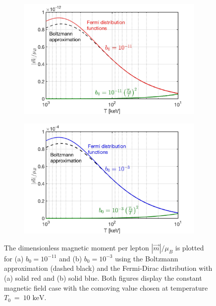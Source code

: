 \documentclass[a4paper]{article}
\newcommand*{\keV}{\text{ keV}}
\begin{document}
\begin{figure}[ht]
    \centering
    \begin{subfigure}[b]{0.49\textwidth}
        \includegraphics[width=\textwidth]{NewMagnetizationDensity001.jpg}
        \caption{}
        \label{fig:one}
    \end{subfigure}
    \hfill
    \begin{subfigure}[b]{0.49\textwidth}
        \includegraphics[width=\textwidth]{NewMagnetizationDensity002.jpg}
        \caption{}
        \label{fig:two}
    \end{subfigure}
    \caption{The dimensionless magnetic moment per lepton $|\vec{m}|/\mu_{B}$ is plotted for (a) $b_{0}=10^{-11}$ and (b) $b_{0}=10^{-3}$ using the Boltzmann approximation (dashed black) and the Fermi-Dirac distribution with (a) solid red and (b) solid blue. Both figures display the constant magnetic field case with the comoving value chosen at temperature $T_{0}~=~10\keV$.}
    \label{magfixedlot}
\end{figure}
\end{document}
